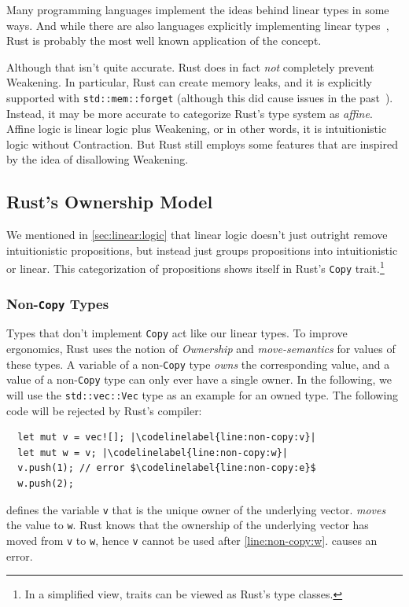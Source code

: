 \documentclass[sigplan,11pt,screen,nonacm]{acmart}
\newcommand*{\Copy}{\texttt{Copy}}
\newcounter{codeline}
\newcommand*{\codelinelabel}[1]{
  \refstepcounter{codeline}
  \setcounter{codeline}{\value{FancyVerbLine}}
  \label[codeline]{#1}
}
\begin{document}
Many programming languages implement the ideas behind linear types in some ways. And while there are also languages explicitly implementing linear types~\cite{austral-intro, par-docs}, Rust is probably the most well known application of the concept.

Although that isn't quite accurate. Rust does in fact \emph{not} completely prevent Weakening. In particular, Rust can create memory leaks, and it is explicitly supported with \texttt{std::mem::forget} (although this did cause issues in the past~\cite{rust:poop}). Instead, it may be more accurate to categorize Rust's type system as \emph{affine}. Affine logic is linear logic plus Weakening, or in other words, it is intuitionistic logic without Contraction. But Rust still employs some features that are inspired by the idea of disallowing Weakening.

\subsection{Rust's Ownership Model} \label{sec:rust:ownership}

We mentioned in \cref{sec:linear:logic} that linear logic doesn't just outright remove intuitionistic propositions, but instead just groups propositions into intuitionistic or linear. This categorization of propositions shows itself in Rust's \Copy{} trait.\footnote{In a simplified view, traits can be viewed as Rust's type classes.}

\subsubsection{Non-\Copy{} Types}

Types that don't implement \Copy{} act like our linear types. To improve ergonomics, Rust uses the notion of \emph{Ownership} and \emph{move-semantics} for values of these types. A variable of a non-\Copy{} type \emph{owns} the corresponding value, and a value of a non-\Copy{} type can only ever have a single owner. In the following, we will use the \texttt{std::vec::Vec} type as an example for an owned type. The following code will be rejected by Rust's compiler:
\begin{verbatim}
  let mut v = vec![]; |\codelinelabel{line:non-copy:v}|
  let mut w = v; |\codelinelabel{line:non-copy:w}|
  v.push(1); // error $\codelinelabel{line:non-copy:e}$
  w.push(2);
\end{verbatim}
 defines the variable \texttt{v} that is the unique owner of the underlying vector.  \emph{moves} the value to \texttt{w}. Rust knows that the ownership of the underlying vector has moved from \texttt{v} to \texttt{w}, hence \texttt{v} cannot be used after \cref*{line:non-copy:w}.  causes an error.
\end{document}
